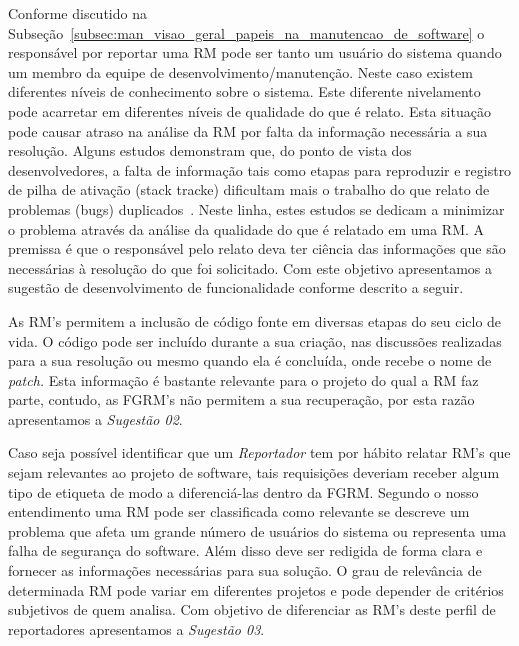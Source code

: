 Conforme discutido na
Subseção~\ref{subsec:man_visao_geral_papeis_na_manutencao_de_software} o
responsável por reportar uma RM pode ser tanto um usuário do sistema quando um
membro da equipe de desenvolvimento/manutenção. Neste caso existem diferentes
níveis de conhecimento sobre o sistema. Este diferente nivelamento pode
acarretar em diferentes níveis de qualidade do que é relato. Esta situação pode
causar atraso na análise da RM por falta da informação necessária a sua
resolução. Alguns estudos demonstram que, do ponto de vista dos desenvolvedores,
a falta de informação tais como etapas para reproduzir e registro de pilha de
ativação (stack tracke) dificultam mais o trabalho do que relato de problemas
(bugs) duplicados~\cite{bettenburg2008makes, bettenburg2007quality}. Neste
linha, estes estudos se dedicam a minimizar o problema através da análise da
qualidade do que é relatado em uma RM\@. A premissa é que o responsável pelo
relato deva ter ciência das informações que são necessárias à resolução do que
foi solicitado. Com este objetivo apresentamos a sugestão de desenvolvimento de
funcionalidade conforme descrito a seguir.


As RM's permitem a inclusão de código fonte em diversas etapas do seu ciclo de
vida. O código pode ser incluído durante a sua criação, nas discussões
realizadas para a sua resolução ou mesmo quando ela é concluída, onde recebe o
nome de \textit{patch.} Esta informação é bastante relevante para o projeto do
qual a RM faz parte, contudo, as FGRM's não permitem a sua recuperação, por esta
razão apresentamos a \textit{Sugestão 02}.


Caso seja possível identificar que um \textit{Reportador} tem por hábito relatar
RM's que sejam relevantes ao projeto de software, tais requisições deveriam
receber algum tipo de etiqueta de modo a diferenciá-las dentro da FGRM\@.
Segundo o nosso entendimento uma RM pode ser classificada como relevante se
descreve um problema que afeta um grande número de usuários do sistema ou
representa uma falha de segurança do software. Além disso deve ser redigida de
forma clara e fornecer as informações necessárias para sua solução. O grau de
relevância de determinada RM pode variar em diferentes projetos e pode depender
de critérios subjetivos de quem analisa. Com objetivo de diferenciar as RM's
deste perfil de reportadores apresentamos a \textit{Sugestão 03}.

